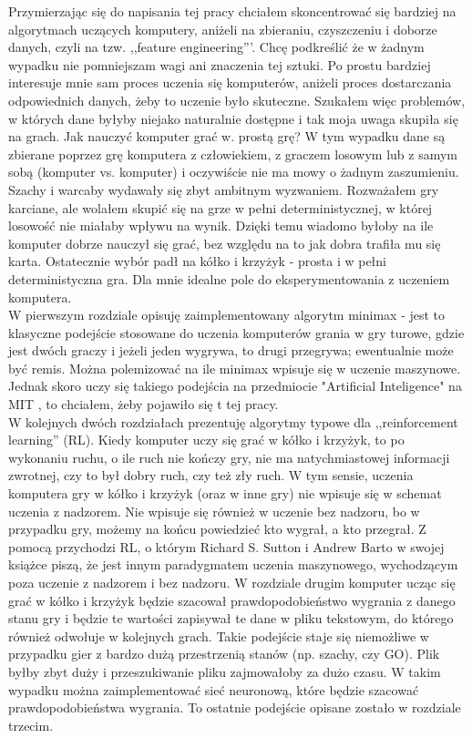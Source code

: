 \documentclass[licencjacka]{pracamgr}
\begin{document}
 Przymierzając się do napisania tej pracy chciałem skoncentrować się bardziej na algorytmach uczących komputery, aniżeli na zbieraniu, czyszczeniu i doborze danych, czyli na tzw. ,,feature engineering'''.  Chcę podkreślić że w żadnym wypadku nie pomniejszam wagi ani znaczenia tej sztuki. Po prostu bardziej interesuje mnie sam proces uczenia się komputerów,  aniżeli proces dostarczania odpowiednich danych, żeby to uczenie było skuteczne. Szukałem więc problemów, w których dane byłyby niejako naturalnie dostępne i tak moja uwaga skupiła się na grach. Jak nauczyć komputer grać w. prostą grę?  W tym wypadku dane są zbierane poprzez grę komputera z człowiekiem, z graczem losowym lub z samym sobą (komputer vs. komputer) i oczywiście nie ma mowy o żadnym zaszumieniu. Szachy i warcaby wydawały się zbyt ambitnym wyzwaniem. Rozważałem gry karciane, ale wolałem skupić się na grze w pełni deterministycznej, w której losowość nie miałaby wpływu na wynik. Dzięki temu wiadomo byłoby na ile komputer dobrze nauczył się grać, bez względu na to jak dobra trafiła mu się karta. Ostatecznie wybór padł na kółko i krzyżyk - prosta i w pełni deterministyczna gra. Dla mnie idealne pole do eksperymentowania z uczeniem komputera. \\

W pierwszym rozdziale opisuję zaimplementowany algorytm minimax - jest to klasyczne podejście stosowane do uczenia komputerów grania w gry turowe, gdzie jest dwóch graczy i jeżeli jeden wygrywa, to drugi przegrywa; ewentualnie może być remis.  Można polemizować na ile minimax wpisuje się w uczenie maszynowe. Jednak skoro uczy się takiego podejścia na przedmiocie "Artificial Inteligence"  na MIT \cite{MIT_AI},  to chciałem, żeby pojawiło się t tej pracy.\\

W kolejnych dwóch rozdziałach prezentuję algorytmy typowe dla ,,reinforcement learning'' (RL). Kiedy komputer uczy się grać w kółko i krzyżyk, to po wykonaniu ruchu, o ile ruch nie kończy gry,  nie ma natychmiastowej informacji zwrotnej, czy to był dobry ruch, czy też zły ruch. W tym sensie, uczenia komputera gry w kółko i krzyżyk (oraz w inne gry) nie wpisuje się w schemat uczenia z nadzorem. Nie wpisuje się również w uczenie bez nadzoru, bo w przypadku gry, możemy na końcu powiedzieć kto wygrał, a kto przegrał. Z pomocą przychodzi RL, o którym Richard S. Sutton i Andrew Barto w swojej książce \cite{RL} piszą, że jest innym paradygmatem uczenia maszynowego, wychodzącym poza uczenie z nadzorem i bez nadzoru.  W rozdziale drugim komputer ucząc się grać w kółko i krzyżyk będzie szacował prawdopodobieństwo wygrania z danego stanu gry i będzie te wartości zapisywał te dane w pliku tekstowym, do którego również odwołuje w kolejnych grach. Takie podejście staje się niemożliwe w przypadku gier z bardzo dużą przestrzenią stanów (np. szachy, czy GO). Plik byłby zbyt duży i przeszukiwanie pliku zajmowałoby za dużo czasu. W takim wypadku można zaimplementować sieć neuronową, które będzie szacować prawdopodobieństwa wygrania. To ostatnie podejście opisane zostało w rozdziale trzecim. \\
\end{document}
